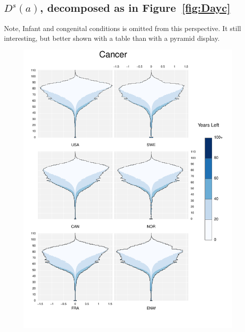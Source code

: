 \documentclass{article}
\begin{document}
\begin{appendices}
\subsection{$D^s(a)$, decomposed as in Figure~\ref{fig:Dayc}}
Note, Infant and congenital conditions is omitted from this perspective. It
still interesting, but better shown with a table than with a pyramid display.
\begin{figure}
\centering
\includegraphics[scale=.8]{Figures/Causes/DxyCancer.pdf}
\end{figure}
\begin{figure}
\centering

\end{figure}
\end{appendices}
\end{document}
